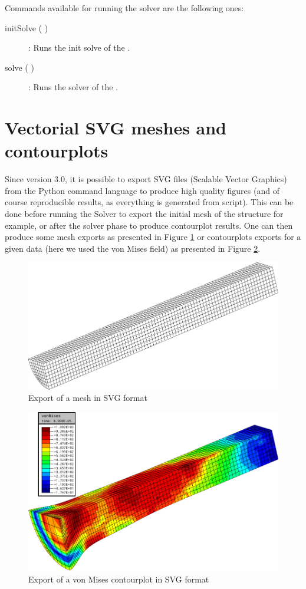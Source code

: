 Commands available for running the solver are the following ones:
\begin{description}
\item [{initSolve ( )}] : Runs the init solve of the \DynELA.
\item [{solve ( )}] : Runs the solver of the \DynELA.
\end{description}


\section{Vectorial SVG meshes and contourplots}
Since \DynELA version 3.0, it is possible to export SVG files (Scalable Vector Graphics) from the Python command language to produce high quality figures (and of course reproducible results, as everything is generated from script). This can be done before running the Solver to export the initial mesh of the structure for example, or after the solver phase to produce contourplot results. One can then produce some mesh exports as presented in Figure \ref{fig:PL!SVG!Mesh} or contourplots exports for a given data (here we used the von Mises field) as presented in Figure \ref{fig:PL!SVG!Contourplot}.
\begin{figure}[h]
\begin{centering}
\includegraphics[width=0.5\columnwidth]{Figures/ProgrammingLanguage/mesh}
\par\end{centering}
\caption{Export of a mesh in SVG format\label{fig:PL!SVG!Mesh}}
\end{figure}

\begin{figure}[h]
\begin{centering}
\includegraphics[width=0.5\columnwidth]{Figures/ProgrammingLanguage/vonMisesCP}
\par\end{centering}
\caption{Export of a von Mises contourplot in SVG format\label{fig:PL!SVG!Contourplot}}
\end{figure}

